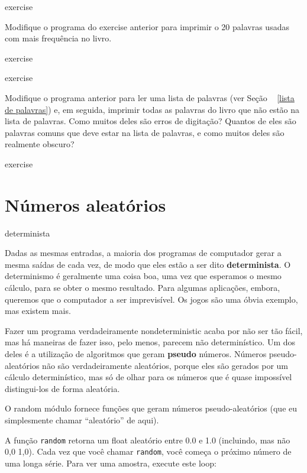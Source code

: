 \documentclass[10pt]{book}
\begin{document}
\begin{exercise}
\begin{v erbatim}
\begin{} exercise

Modifique o programa do exercise anterior para imprimir o
20 palavras usadas com mais frequência no livro.

\end{} exercise


\begin{} exercise

Modifique o programa anterior para ler uma lista de palavras (ver
Seção ~ \ref {lista de palavras}) e, em seguida, imprimir todas as palavras do livro que
não estão na lista de palavras. Como muitos deles são erros de digitação? Quantos de
eles são palavras comuns que {\em} deve estar na lista de palavras, e como
muitos deles são realmente obscuro?

\end{} exercise


\section{Números aleatórios}
\index{} determinista

Dadas as mesmas entradas, a maioria dos programas de computador gerar a mesma
saídas de cada vez, de modo que eles estão a ser dito {\bf determinista}.
O determinismo é geralmente uma coisa boa, uma vez que esperamos o mesmo
cálculo, para se obter o mesmo resultado. Para algumas aplicações, embora,
queremos que o computador a ser imprevisível. Os jogos são uma óbvia
exemplo, mas existem mais.

Fazer um programa verdadeiramente nondeterministic acaba por não ser tão fácil,
mas há maneiras de fazer isso, pelo menos, parecem não determinístico. Um dos
deles é a utilização de algoritmos que geram {\bf pseudo} números.
Números pseudo-aleatórios não são verdadeiramente aleatórios, porque eles são gerados
por um cálculo determinístico, mas só de olhar para os números que
é quase impossível distingui-los de forma aleatória.

O {random \tt} módulo fornece funções que geram
números pseudo-aleatórios (que eu simplesmente chamar ``aleatório'' de
aqui).

A função {\tt random} retorna um float aleatório
entre 0.0 e 1.0 (incluindo, mas não 0,0 1,0). Cada vez que você
chamar {\tt random}, você começa o próximo número de uma longa série. Para ver uma
amostra, execute este loop:


\end{v erbatim}
\end{exercise}
\end{document}
